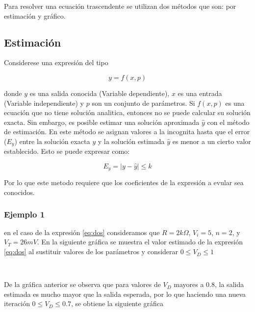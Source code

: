 \documentclass{article}
\begin{document}
Para resolver una ecuación trascendente se utilizan dos métodos que son:
por estimación y gráfico.

\subsection{Estimación}\label{estimaciuxf3n}

Considerese una expresión del tipo

\begin{equation}\label{eq:idea1}
y=f(x,p)
\end{equation}

donde $y$ es una salida conocida (Variable dependiente), $x$ es una
entrada (Variable independiente) y $p$ son un conjunto de parámetros. Si
$f(x,p)$ es una ecuación que no tiene solución analitica, entonces no se
puede calcular su solución exacta. Sin embargo, es posible estimar una
solución aproximada $\hat{y}$ con el método de estimación. En este
método se asignan valores a la incognita hasta que el error ($E_{y}$)
entre la solución exacta $y$ y la solución estimada $\hat{y}$ es menor a
un cierto valor establecido. Esto se puede expresar como:

\[
E_{y}=|y-\hat{y}|\leq k
\]

Por lo que este metodo requiere que los coeficientes de la expresión a
evular sea conocidos.

\subsubsection{Ejemplo 1}\label{ejemplo-1}

en el caso de la expresión \eqref{eq:dos} consideramos que $R=2k\Omega$,
$V_{i}=5$, $n=2$, y $V_{T}=26mV$. En la siguiente gráfica se muestra el
valor estimado de la expresión \eqref{eq:dos} al sustituir valores de
los parámetros y considerar $0\leq V_{D} \leq 1$


    \begin{center}
    \end{center}
    { \hspace*{\fill} \\}
    
    De la gráfica anterior se observa que para valores de $V_{D}$ mayores a
0.8, la salida estimada es mucho mayor que la salida esperada, por lo
que haciendo una nueva iteración $0\leq V_{D} \leq 0.7$, se obtiene la
siguiente gráfica
\end{document}
